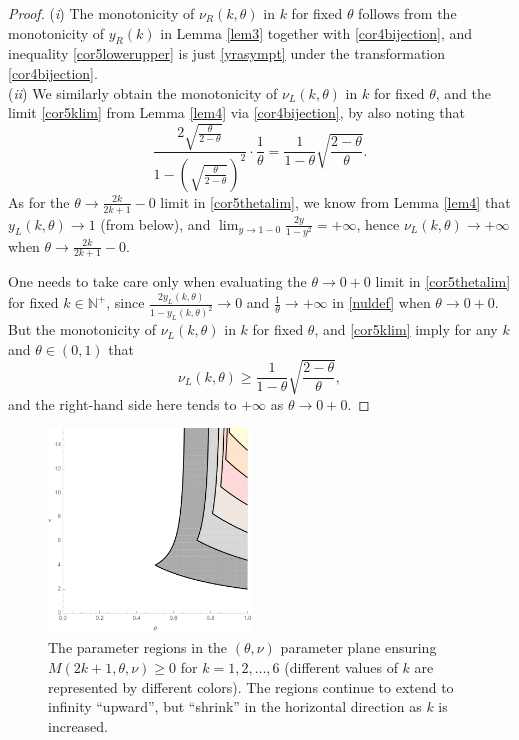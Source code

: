 \documentclass[smallextended,numbook,runningheads]{svjour3}     %
\newcommand{\te}{\theta}
\newcommand{\nul}{\nu_L(k,\theta)}
\newcommand{\nur}{\nu_R(k,\theta)}
\newcommand{\yl}{y_L(k,\theta)}
\newcommand{\yr}{y_R(k)}
\newcommand{\nplus}{\mathbb{N}^+}
\begin{document}
\begin{proof} (\textit{i}) The monotonicity of $\nur$ in $k$ for fixed $\te$ follows from the monotonicity of 
$\yr$ in Lemma \ref{lem3} together with \eqref{cor4bijection}, and inequality \eqref{cor5lowerupper} is 
just \eqref{yrasympt} under the transformation \eqref{cor4bijection}.\\
(\textit{ii}) We similarly obtain the monotonicity of $\nul$ in $k$ for fixed $\te$, and the limit \eqref{cor5klim} from Lemma \ref{lem4} via \eqref{cor4bijection}, by also noting that
\[
\frac{2\sqrt{\frac{\te}{2-\te}}}{1-\left(\sqrt{\frac{\te}{2-\te}}\right)^2}\cdot \frac{1}{\te}=\frac{1}{1-\theta }\sqrt{\frac{2-\theta }{\theta }}.
\]
As for the $\te\to\frac{2k}{2k+1}-0$ limit in \eqref{cor5thetalim}, we know from Lemma \ref{lem4} that $\yl\to 1$ (from below), and $\lim_{y\to 1-0}\frac{2y}{1-y^2}=+\infty$, hence $\nul\to+\infty$ when $\te\to\frac{2k}{2k+1}-0$.

One needs to take care only when evaluating the $\te\to 0+0$ limit in \eqref{cor5thetalim} for fixed $k\in\nplus$,  since $\frac{2\yl}{1-\yl^2}\to 0$ and $\frac{1}{\te}\to+\infty$ in \eqref{nuldef} when $\te\to0+0$. But 
the monotonicity of $\nul$ in $k$ for fixed $\te$, and \eqref{cor5klim} imply for any $k$ and $\te\in(0,1)$ that 
\[
\nul\ge\frac{1}{1-\theta }\sqrt{\frac{2-\theta }{\theta }},
\]
and the right-hand side here tends to $+\infty$ as $\te\to 0+0$.
\end{proof}

\begin{figure}
\begin{center}
\includegraphics[width=0.48\textwidth]{fig_variousk.pdf}
\caption{The parameter regions in the $(\te,\nu)$ parameter plane ensuring $M(2k+1,\te,\nu)\ge 0$ for $k=1, 2, \ldots, 6$ (different values of $k$ are represented by different colors). The regions continue to extend to infinity ``upward'', but ``shrink'' in the horizontal direction as $k$ is increased.}\label{fig_variousk}
\end{center}
\end{figure}
\end{document}
